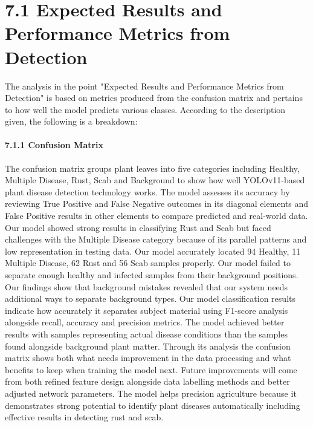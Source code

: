 \documentclass{book} %
\begin{document}
\noindent 
\section{7.1 Expected Results and Performance Metrics from Detection}

\noindent The analysis in the point "Expected Results and Performance Metrics from Detection" is based on metrics produced from the confusion matrix and pertains to how well the model predicts various classes. According to the description given, the following is a breakdown:

\noindent 
\paragraph{7.1.1 Confusion Matrix }

\noindent The confusion matrix groups plant leaves into five categories including Healthy, Multiple Disease, Rust, Scab and Background to show how well YOLOv11-based plant disease detection technology works. The model assesses its accuracy by reviewing True Positive and False Negative outcomes in its diagonal elements and False Positive results in other elements to compare predicted and real-world data. Our model showed strong results in classifying Rust and Scab but faced challenges with the Multiple Disease category because of its parallel patterns and low representation in testing data. Our model accurately located 94 Healthy, 11 Multiple Disease, 62 Rust and 56 Scab samples properly. Our model failed to separate enough healthy and infected samples from their background positions. Our findings show that background mistakes revealed that our system needs additional ways to separate background types. Our model classification results indicate how accurately it separates subject material using F1-score analysis alongside recall, accuracy and precision metrics. The model achieved better results with samples representing actual disease conditions than the samples found alongside background plant matter. Through its analysis the confusion matrix shows both what needs improvement in the data processing and what benefits to keep when training the model next. Future improvements will come from both refined feature design alongside data labelling methods and better adjusted network parameters. The model helps precision agriculture because it demonstrates strong potential to identify plant diseases automatically including effective results in detecting rust and scab.

\noindent 
\end{document}
